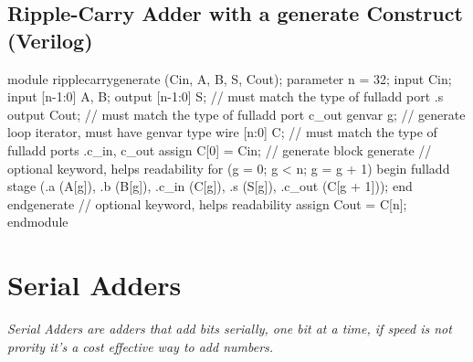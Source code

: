 \documentclass[12pt,openany]{book}
\begin{document}
\subsection{Ripple-Carry Adder with a generate Construct (Verilog)}

\begin{minipage}[htp]{1\textwidth}
	\begin{vhdl}
module ripplecarrygenerate (Cin, A, B, S, Cout);
	parameter n = 32;
	input Cin;
	input [n-1:0] A, B;
	output [n-1:0] S; // must match the type of fulladd port .s
	output Cout; // must match the type of fulladd port c_out
	genvar g; // generate loop iterator, must have genvar type
	wire [n:0] C; // must match the type of fulladd ports .c_in, c_out
	assign C[0] = Cin;
	// generate block
	generate // optional keyword, helps readability
	for (g = 0; g < n; g = g + 1) begin
	fulladd stage (.a (A[g]), .b (B[g]), .c_in (C[g]), .s (S[g]), .c_out (C[g + 1]));
	end
	endgenerate // optional keyword, helps readability
	assign Cout = C[n];
endmodule
	\end{vhdl}
\end{minipage}
\section{Serial Adders}
\textit{Serial Adders are adders that add bits serially, one bit at a time, if speed is not prority it's a cost effective way to add numbers.}
\end{document}
